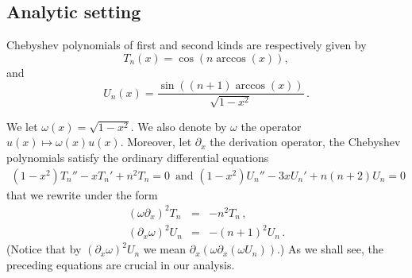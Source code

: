 \documentclass[a4paper]{article}
\begin{document}
	\subsection{Analytic setting}
	Chebyshev polynomials of first and second kinds are respectively given by 
	\[T_n(x) = \cos(n \arccos(x)),\]
	and 
	\[U_n(x) = \dfrac{\sin((n+1) \arccos(x))}{\sqrt{1 - x^2}}\,.\]
	
	We let $\omega(x) = \sqrt{1-x^2}$. We also denote by $\omega$ the operator $u(x) \mapsto \omega(x)u(x)$. Moreover, let $\partial_x$ the derivation operator, the Chebyshev polynomials satisfy
	the ordinary differential equations
	\begin{eqnarray*}
		(1-x^2)T_n'' -xT_n' +n^2T_n =0\,\mbox{ and }(1-x^2)U_n'' -3xU_n' +n(n+2)U_n =0
	\end{eqnarray*}
	that we rewrite under the form
	\begin{eqnarray}
	(\omega\partial_x)^2 T_n &=& -n^2T_n\,, \label{cheb1}\\
	(\partial_x\omega)^2 U_n &=& -(n+1)^2U_n\, .\label{cheb2}
	\end{eqnarray}
	(Notice that by $(\partial_x\omega)^2 U_n$ we mean $\partial_x(\omega \partial_x (\omega U_n))$.)
	As we shall see, the preceding equations are crucial in our analysis. 
	
\end{document}
